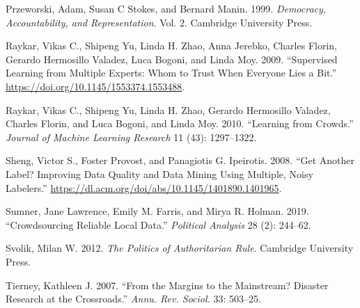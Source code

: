 \documentclass[]{article}
\begin{document}
\leavevmode\hypertarget{ref-przeworski1999democracy}{}%
Przeworski, Adam, Susan C Stokes, and Bernard Manin. 1999. \emph{Democracy, Accountability, and Representation}. Vol. 2. Cambridge University Press.

\leavevmode\hypertarget{ref-Raykar2009}{}%
Raykar, Vikas C., Shipeng Yu, Linda H. Zhao, Anna Jerebko, Charles Florin, Gerardo Hermosillo Valadez, Luca Bogoni, and Linda Moy. 2009. ``Supervised Learning from Multiple Experts: Whom to Trust When Everyone Lies a Bit.'' \url{https://doi.org/10.1145/1553374.1553488}.

\leavevmode\hypertarget{ref-Raykar2010}{}%
Raykar, Vikas C., Shipeng Yu, Linda H. Zhao, Gerardo Hermosillo Valadez, Charles Florin, and Luca Bogoni, and Linda Moy. 2010. ``Learning from Crowds.'' \emph{Journal of Machine Learning Research} 11 (43): 1297--1322.

\leavevmode\hypertarget{ref-Sheng2008}{}%
Sheng, Victor S., Foster Provost, and Panagiotis G. Ipeirotis. 2008. ``Get Another Label? Improving Data Quality and Data Mining Using Multiple, Noisy Labelers.'' \url{https://dl.acm.org/doi/abs/10.1145/1401890.1401965}.

\leavevmode\hypertarget{ref-sumneretal2019}{}%
Sumner, Jane Lawrence, Emily M. Farris, and Mirya R. Holman. 2019. ``Crowdsourcing Reliable Local Data.'' \emph{Political Analysis} 28 (2): 244--62.

\leavevmode\hypertarget{ref-svolik2012politics}{}%
Svolik, Milan W. 2012. \emph{The Politics of Authoritarian Rule}. Cambridge University Press.

\leavevmode\hypertarget{ref-tierney2007margins}{}%
Tierney, Kathleen J. 2007. ``From the Margins to the Mainstream? Disaster Research at the Crossroads.'' \emph{Annu. Rev. Sociol.} 33: 503--25.
\end{document}
